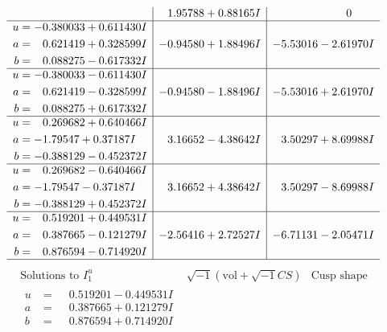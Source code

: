 \documentclass[1p]{elsarticle_modified}
\theoremstyle{definition}
\newcommand{\I}{\sqrt{-1}}
\begin{document}
$$\begin{array}{c|c|c}
 & \phantom{-}1.95788 + 0.88165 I & \phantom{-0.000000 } 0 \\ \hline\begin{aligned}
u &= -0.380033 + 0.611430 I \\
a &= \phantom{-}0.621419 + 0.328599 I \\
b &= \phantom{-}0.088275 - 0.617332 I\end{aligned}
 & -0.94580 + 1.88496 I & -5.53016 - 2.61970 I \\ \hline\begin{aligned}
u &= -0.380033 - 0.611430 I \\
a &= \phantom{-}0.621419 - 0.328599 I \\
b &= \phantom{-}0.088275 + 0.617332 I\end{aligned}
 & -0.94580 - 1.88496 I & -5.53016 + 2.61970 I \\ \hline\begin{aligned}
u &= \phantom{-}0.269682 + 0.640466 I \\
a &= -1.79547 + 0.37187 I \\
b &= -0.388129 - 0.452372 I\end{aligned}
 & \phantom{-}3.16652 - 4.38642 I & \phantom{-}3.50297 + 8.69988 I \\ \hline\begin{aligned}
u &= \phantom{-}0.269682 - 0.640466 I \\
a &= -1.79547 - 0.37187 I \\
b &= -0.388129 + 0.452372 I\end{aligned}
 & \phantom{-}3.16652 + 4.38642 I & \phantom{-}3.50297 - 8.69988 I \\ \hline\begin{aligned}
u &= \phantom{-}0.519201 + 0.449531 I \\
a &= \phantom{-}0.387665 - 0.121279 I \\
b &= \phantom{-}0.876594 - 0.714920 I\end{aligned}
 & -2.56416 + 2.72527 I & -6.71131 - 2.05471 I\\
 \hline 
 \end{array}$$\newpage$$\begin{array}{c|c|c}  
\text{Solutions to }I^u_{1}& \I (\text{vol} + \sqrt{-1}CS) & \text{Cusp shape}\\
 \hline 
\begin{aligned}
u &= \phantom{-}0.519201 - 0.449531 I \\
a &= \phantom{-}0.387665 + 0.121279 I \\
b &= \phantom{-}0.876594 + 0.714920 I\end{aligned}

\end{array}$$
\end{document}
